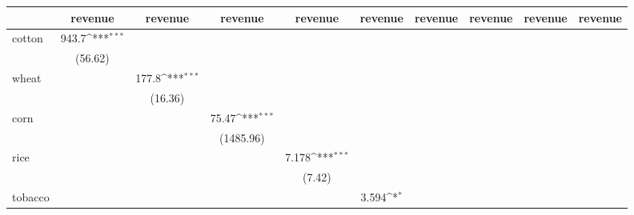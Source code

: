 {
\def\sym#1{\ifmmode^{#1}\else\(^{#1}\)\fi}
\begin{tabular}{l*{9}{c}}
\hline\hline
            &\multicolumn{1}{c}{revenue}&\multicolumn{1}{c}{revenue}&\multicolumn{1}{c}{revenue}&\multicolumn{1}{c}{revenue}&\multicolumn{1}{c}{revenue}&\multicolumn{1}{c}{revenue}&\multicolumn{1}{c}{revenue}&\multicolumn{1}{c}{revenue}&\multicolumn{1}{c}{revenue}\\
\hline
cotton      &       943.7\sym{***}&                     &                     &                     &                     &                     &                     &                     &                     \\
            &     (56.62)         &                     &                     &                     &                     &                     &                     &                     &                     \\
[1em]
wheat       &                     &       177.8\sym{***}&                     &                     &                     &                     &                     &                     &                     \\
            &                     &     (16.36)         &                     &                     &                     &                     &                     &                     &                     \\
[1em]
corn        &                     &                     &       75.47\sym{***}&                     &                     &                     &                     &                     &                     \\
            &                     &                     &   (1485.96)         &                     &                     &                     &                     &                     &                     \\
[1em]
rice        &                     &                     &                     &       7.178\sym{***}&                     &                     &                     &                     &                     \\
            &                     &                     &                     &      (7.42)         &                     &                     &                     &                     &                     \\
[1em]
tobacco     &                     &                     &                     &                     &       3.594\sym{*}  &                     &                     &                     &                     \\

\end{tabular}}
